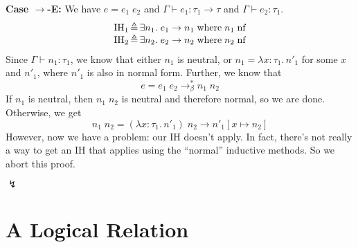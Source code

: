 \documentclass{lecturenotes}
\newcommand{\tabs}[3]{\ensuremath{\lambda #1 \colon #2.\,#3}}
\newcommand{\app}[2]{\ensuremath{#1\;#2}}
\newcommand{\nf}[1]{#1\;\text{nf}}
\begin{document}
\noindent\textbf{Case $\to$-E:}
We have $e = \app{e_1}{e_2}$ and $\Gamma \vdash e_1 : \tau_1 \to \tau$ and $\Gamma \vdash e_2 : \tau_1$.
$$
\begin{array}{r@{\,\triangleq\,}l}
  \text{IH}_1 & \exists n_1.\; e_1 \to n_1 \mathrel{\text{where}} \nf{n_1}\\
  \text{IH}_2 & \exists n_2.\; e_2 \to n_2 \mathrel{\text{where}} \nf{n_2}
\end{array}
$$
Since $\Gamma \vdash n_1 : \tau_1$, we know that either $n_1$ is neutral, or $n_1 = \tabs{x}{\tau_1}{n'_1}$ for some $x$ and $n'_1$, where $n'_1$ is also in normal form.
Further, we know that
$$e = \app{e_1}{e_2} \to^\ast_\beta \app{n_1}{n_2}$$
If $n_1$ is neutral, then $\app{n_1}{n_2}$ is neutral and therefore normal, so we are done.
Otherwise, we get
$$\app{n_1}{n_2} = \app{(\tabs{x}{\tau_1}{n'_1})}{n_2} \to n'_1[x \mapsto n_2]$$
However, now we have a problem: our IH doesn't apply.
In fact, there's not really a way to get an IH that applies using the ``normal'' inductive methods.
So we abort this proof.
\begin{flushright}
  $\lightning$
\end{flushright}

\section{A Logical Relation}
\label{sec:logical-relation}
\end{document}
